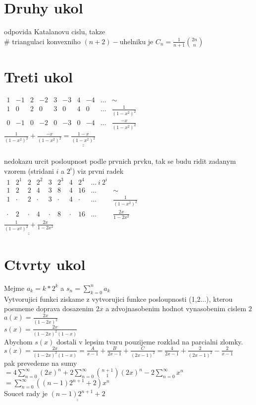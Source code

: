 \documentclass[a4paper]{article}
\def\doubleunderline#1{\underline{\underline{#1}}}
\begin{document}
\section*{Druhy ukol}
odpovida Katalanovu cislu, takze\\
\# triangulaci konvexniho $(n+2)-$uhelniku je $C_n = \frac{1}{n+1}\binom{2n}{n}$



\section*{Treti ukol}
$\begin{matrix}
	1&-1&2&-2&3&-3&4&-4& \dots & \sim \\
	\hline
	1&0&2&0&3&0&4&0& \dots & \frac{1}{(1-x^2)^2} \\
	0&-1&0&-2&0&-3&0&-4& \dots & \frac{-x}{(1-x^2)^2}
\end{matrix}$\\
$\frac{1}{(1-x^2)^2} + \frac{-x}{(1-x^2)^2} = \doubleunderline{\frac{1-x}{(1-x^2)^2}}$
\\\\
nedokazu urcit posloupnost podle prvnich prvku, tak se budu ridit zadanym vzorem (stridani $i$ a $2^i$) viz prvni radek\\
$\begin{matrix}
	1&2^1&2&2^2&3&2^3&4&2^4& \dots~i ~ 2^i \\
	1&2&2&4&3&8&4&16& \dots & \sim\\
	\hline
	1 & \cdot & 2 &\cdot & 3 &\cdot & 4 &\cdot & \dots & \frac{1}{(1-x^2)^2}\\
	\cdot & 2 & \cdot & 4 & \cdot & 8 & \cdot & 16 & \dots & \frac{2x}{1-2x^2} 
\end{matrix}$\\
$\doubleunderline{\frac{1}{(1-x^2)^2}+\frac{2x}{1-2x^2}}$





\section*{Ctvrty ukol}
Mejme $a_k = k*2^k$ a $s_n = \sum_{k=0}^n{a_k}$\\
Vytvorujici funkci ziskame z vytvorujici funkce posloupnosti (1,2...), kterou posuneme doprava dosazenim $2x$ a zdvojnasobenim hodnot vynasobenim cislem $2$\\
$a(x) = \frac{2x}{(1-2x)^2}$\\
$s(x)=\frac{2x}{(1-2x)^2(1-x)}$\\
Abychom $s(x)$ dostali v lepsim tvaru pouzijeme rozklad na parcialni zlomky.\\
$s(x)=
\frac{2x}{(1-2x)^2(1-x)}=
\frac{A}{x-1}+\frac{B}{2x-1}+\frac{C}{(2x-1)^2}=
\frac{4}{2 x - 1} + \frac{2}{(2x-1)^2} - \frac{2}{x-1}
$\\
pak prevedeme na sumy\\
$=4\sum^\infty_{n=0}(2x)^n + 2\sum^\infty_{n=0}\binom{n+1}{1}(2x)^n - 2\sum^\infty_{n=0}x^n$\\
$=\sum^\infty_{n=0}((n-1)2^{n+1}+2)x^n$\\
Soucet rady je $\doubleunderline{(n-1)2^{n+1}+2}$
\end{document}
